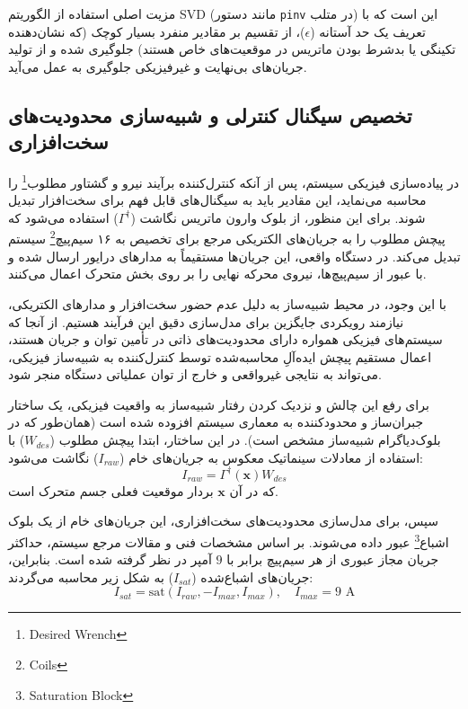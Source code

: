 	مزیت اصلی استفاده از الگوریتم SVD (مانند دستور \texttt{pinv} در متلب) این است که با تعریف یک حد آستانه ($\epsilon$)، از تقسیم بر مقادیر منفرد بسیار کوچک (که نشان‌دهنده تکینگی یا بدشرط بودن ماتریس در موقعیت‌های خاص هستند) جلوگیری شده و از تولید جریان‌های بی‌نهایت و غیرفیزیکی جلوگیری به عمل می‌آید.
	
	\subsection{تخصیص سیگنال کنترلی و شبیه‌سازی محدودیت‌های سخت‌افزاری}
	\label{subsec:method-allocation}
	
	در پیاده‌سازی فیزیکی سیستم، پس از آنکه کنترل‌کننده برآیند نیرو و گشتاور مطلوب\footnote{Desired Wrench} را محاسبه می‌نماید، این مقادیر باید به سیگنال‌های قابل فهم برای سخت‌افزار تبدیل شوند. برای این منظور، از بلوک وارون ماتریس نگاشت ($\Gamma^\dagger$) استفاده می‌شود که پیچش مطلوب را به جریان‌های الکتریکی مرجع برای تخصیص به ۱۶ سیم‌پیچ\footnote{Coils} سیستم تبدیل می‌کند. در دستگاه واقعی، این جریان‌ها مستقیماً به مدارهای درایور ارسال شده و با عبور از سیم‌پیچ‌ها، نیروی محرکه نهایی را بر روی بخش متحرک اعمال می‌کنند.
	
	با این وجود، در محیط شبیه‌ساز به دلیل عدم حضور سخت‌افزار و مدارهای الکتریکی، نیازمند رویکردی جایگزین برای مدل‌سازی دقیق این فرآیند هستیم. از آنجا که سیستم‌های فیزیکی همواره دارای محدودیت‌های ذاتی در تأمین توان و جریان هستند، اعمال مستقیم پیچش ایده‌آلِ محاسبه‌شده توسط کنترل‌کننده به شبیه‌ساز فیزیکی، می‌تواند به نتایجی غیرواقعی و خارج از توان عملیاتی دستگاه منجر شود. 
	
	برای رفع این چالش و نزدیک کردن رفتار شبیه‌ساز به واقعیت فیزیکی، یک ساختار جبران‌ساز و محدودکننده به معماری سیستم افزوده شده است (همان‌طور که در بلوک‌دیاگرام شبیه‌ساز مشخص است). در این ساختار، ابتدا پیچش مطلوب ($W_{des}$) با استفاده از معادلات سینماتیک معکوس به جریان‌های خام ($I_{raw}$) نگاشت می‌شود:
	\begin{equation}
		I_{raw} = \Gamma^\dagger(\mathbf{x}) W_{des}
		\label{eq:method-raw-current}
	\end{equation}
	که در آن $\mathbf{x}$ بردار موقعیت فعلی جسم متحرک است. 
	
	سپس، برای مدل‌سازی محدودیت‌های سخت‌افزاری، این جریان‌های خام از یک بلوک اشباع\footnote{Saturation Block} عبور داده می‌شوند. بر اساس مشخصات فنی و مقالات مرجع سیستم، حداکثر جریان مجاز عبوری از هر سیم‌پیچ برابر با $9$ آمپر در نظر گرفته شده است. بنابراین، جریان‌های اشباع‌شده ($I_{sat}$) به شکل زیر محاسبه می‌گردند:
	\begin{equation}
		I_{sat} = \text{sat}(I_{raw}, -I_{max}, I_{max}), \quad I_{max} = 9 \text{ A}
		\label{eq:method-current-saturation}
	\end{equation}
	
